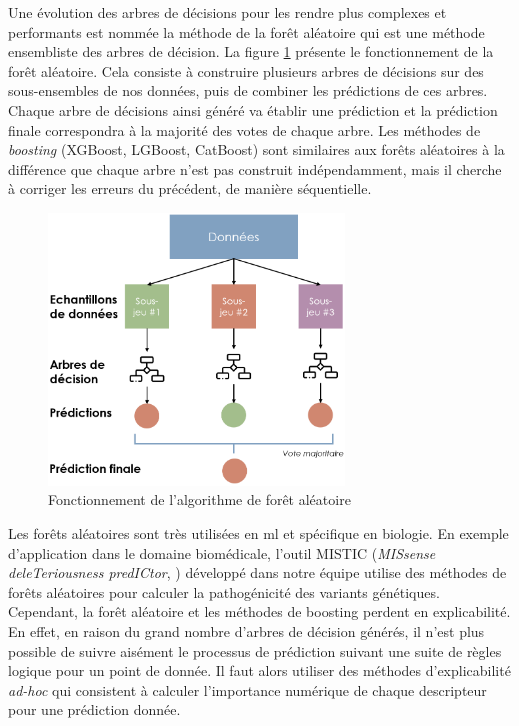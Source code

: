 Une évolution des arbres de décisions pour les rendre plus complexes et performants est nommée la méthode de la forêt aléatoire qui est une méthode ensembliste des arbres de décision. La figure \ref{fig:random-forest} présente le fonctionnement de la forêt aléatoire. Cela consiste à construire plusieurs arbres de décisions sur des sous-ensembles de nos données, puis de combiner les prédictions de ces arbres. Chaque arbre de décisions ainsi généré va établir une prédiction et la prédiction finale correspondra à la majorité des votes de chaque arbre. Les méthodes de \textit{boosting}  (XGBoost, LGBoost, CatBoost) sont similaires aux forêts aléatoires à la différence que chaque arbre n'est pas construit indépendamment, mais il cherche à corriger les erreurs du précédent, de manière séquentielle.
\begin{figure}[!ht]
 \centering
 \includegraphics[width=0.7\textwidth]{figures/random_forest.png}
 \caption[Fonctionnement de l'algorithme de forêt aléatoire]{Fonctionnement de l'algorithme de forêt aléatoire}
 \label{fig:random-forest}
\end{figure}
Les forêts aléatoires sont très utilisées en \gls{ml} et spécifique en biologie. En exemple d'application dans le domaine biomédicale, l'outil MISTIC (\textit{MISsense deleTeriousness predICtor}, \cite{chennen_mistic_2020}) développé dans notre équipe utilise des méthodes de forêts aléatoires pour calculer la pathogénicité des variants génétiques. Cependant, la forêt aléatoire et les méthodes de boosting perdent en explicabilité. En effet, en raison du grand nombre d'arbres de décision générés, il n'est plus possible de suivre aisément le processus de prédiction suivant une suite de règles logique pour un point de donnée. Il faut alors utiliser des méthodes d'explicabilité \textit{ad-hoc} qui consistent à calculer l'importance numérique de chaque descripteur pour une prédiction donnée.

